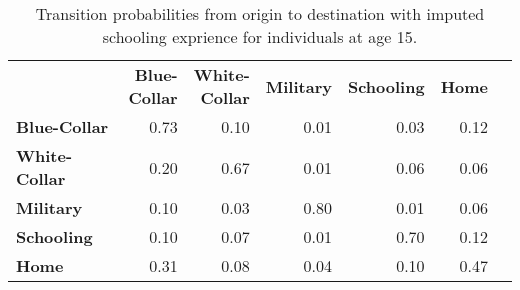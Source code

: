 \begin{ThreePartTable}

	\begin{longtable}[c]{@{}lrrrrrr@{}}
		\caption{Transition probabilities from origin to destination with imputed schooling exprience for individuals at age 15.}
		\label{tab:TransitionProbabilitiesImputing}

		\setlength\extrarowheight{2.5pt}
		
		\\
		\toprule
   & \thead{\textbf{Blue-} \\ \textbf{Collar}}    & \thead{\textbf{White-} \\ \textbf{Collar}}  & \textbf{Military} & \textbf{Schooling} & \textbf{Home}   \\ \midrule
		\endfirsthead
		
\textbf{Blue-Collar}	&	0.73	&	0.10	&	0.01	&	0.03	&	0.12	\\
\textbf{White-Collar	} &	0.20	&	0.67	&	0.01	&	0.06	&	0.06	\\
\textbf{Military	} &	0.10	&	0.03	&	0.80	&	0.01	&	0.06	\\
\textbf{Schooling}	&	0.10&	0.07	&	0.01	&	0.70	&	0.12	\\
\textbf{Home	} &	0.31	&	0.08	&	0.04	&	0.10	&	0.47	\\
  \bottomrule
	\end{longtable}
\end{ThreePartTable}